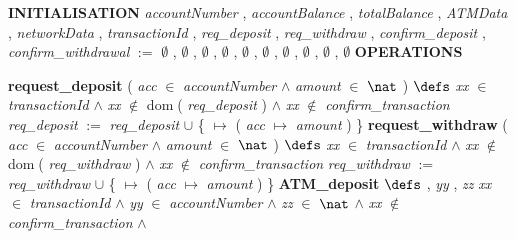 \vspace{-4.5ex}\bsetindent
\begin{tabbing}
\bSetTabs
\+\> \-
%
%
\bbnl
{\bf INITIALISATION} \+ \bbnl
{\em accountNumber\/} , \bnl
{\em accountBalance\/} , {\em totalBalance\/} , \bnl
{\em ATMData\/} , {\em networkData\/} , \bnl
{\em transactionId\/} , \bnl
{\em req\_deposit\/} , {\em req\_withdraw\/} , \bnl
{\em confirm\_deposit\/} , {\em confirm\_withdrawal\/} $:=$   $\emptyset$  ,  $\emptyset$  ,  $\emptyset$  ,  $\emptyset$  ,  $\emptyset$  ,  $\emptyset$  ,  $\emptyset$  ,  $\emptyset$  ,  $\emptyset$  ,  $\emptyset$  \-
%
%
\bnl\bnl
{\bf OPERATIONS} \+ \bbnl

%
%
{\bf { request\_deposit}} ( {\em acc\/} $\in$ {\em accountNumber\/} $\wedge$
{\em amount\/} $\in$  $\nat$  ) \bhsp $\defs$ \+ \bnl
  \+\bnl
{}  \-\bnl
{} \+\bnl
{\em xx\/} $\in$ {\em transactionId\/} $\wedge$ \bnl
{\em xx\/} $\not\in$  {\sf dom}$\;$( {\em req\_deposit\/} )  $\wedge$ \bnl
{\em xx\/} $\not\in$ {\em confirm\_transaction\/} \-\bnl
{} \+\bnl
{\em req\_deposit\/} $:=$  {\em req\_deposit\/} $\cup$  \{  $\mapsto$  ( {\em acc\/} $\mapsto$ {\em amount\/} )  \- \}  \-\bnl
{}  \-\bnl
{}  \- \bOperationSemiColon \bbnl
%
%
{\bf { request\_withdraw}} ( {\em acc\/} $\in$ {\em accountNumber\/} $\wedge$
{\em amount\/} $\in$  $\nat$  ) \bhsp $\defs$ \+ \bnl
  \+\bnl
{}  \-\bnl
{} \+\bnl
{\em xx\/} $\in$ {\em transactionId\/} $\wedge$ \bnl
{\em xx\/} $\not\in$  {\sf dom}$\;$( {\em req\_withdraw\/} )  $\wedge$ \bnl
{\em xx\/} $\not\in$ {\em confirm\_transaction\/} \-\bnl
{} \+\bnl
{\em req\_withdraw\/} $:=$  {\em req\_withdraw\/} $\cup$  \{  $\mapsto$  ( {\em acc\/} $\mapsto$ {\em amount\/} )  \- \}  \-\bnl
{}  \-\bnl
{}  \- \bOperationSemiColon \bbnl
%
%
{\bf { ATM\_deposit}}  \bhsp $\defs$ \+ \bnl
  \+\bnl
{}  , {\em yy\/} , {\em zz\/} \-\bnl
{} \+\bnl
{\em xx\/} $\in$ {\em transactionId\/} $\wedge$ \bnl
{\em yy\/} $\in$ {\em accountNumber\/} $\wedge$ \bnl
{\em zz\/} $\in$  $\nat$  $\wedge$ \bnl
{\em xx\/} $\not\in$ {\em confirm\_transaction\/} $\wedge$ \bnl

\end{tabbing}
